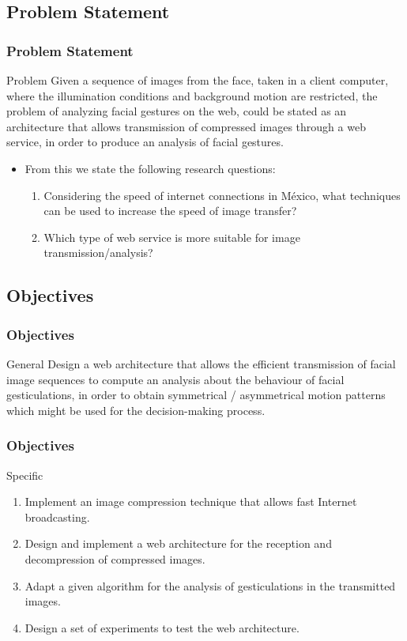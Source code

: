 \documentclass[compress]{beamer}
\begin{document}
\subsection{Problem Statement}
\begin{frame}
	\frametitle{Problem Statement}
	\begin{alertblock}{Problem}
	Given a sequence of images from the face, taken in a client computer, where the illumination conditions and background motion are restricted, the problem of analyzing facial gestures on the web, could be stated as an architecture that allows transmission of compressed images through a web service, in order to produce an analysis of facial gestures.
	\end{alertblock}

	\begin{itemize}
		\item From this we state the following research questions:
		\begin{enumerate}
			\item Considering the speed of internet connections in M\'exico, what techniques can be used to increase the speed of image transfer?
			\item Which type of web service is more suitable for image transmission/analysis?
		\end{enumerate}
	\end{itemize}
\end{frame}

\subsection{Objectives}
\begin{frame}
	\frametitle{Objectives}
	\begin{block}{General}
	Design a web architecture that allows the efficient transmission of facial image sequences to compute an analysis about the behaviour of facial gesticulations, in order to obtain symmetrical / asymmetrical motion patterns which might be used for the decision-making process.
	\end{block}
\end{frame}

\begin{frame}
	\frametitle{Objectives}
	\begin{block}{Specific}
		\begin{enumerate}
		\item Implement an image compression technique that allows fast Internet broadcasting.
		\item Design and implement a web architecture for the reception and decompression of compressed images.
		\item Adapt a given algorithm for the analysis of gesticulations in the transmitted images.
		\item Design a set of experiments to test the web architecture.
		\end{enumerate}
	\end{block}
\end{frame}
\end{document}
